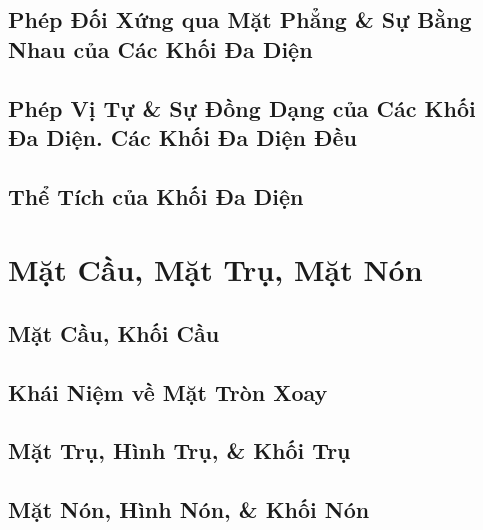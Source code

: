 \documentclass[oneside]{book}
\numberwithin{equation}{section}
\begin{document}
\section{Phép Đối Xứng qua Mặt Phẳng \& Sự Bằng Nhau của Các Khối Đa Diện}


\section{Phép Vị Tự \& Sự Đồng Dạng của Các Khối Đa Diện. Các Khối Đa Diện Đều}


\section{Thể Tích của Khối Đa Diện}


\chapter{Mặt Cầu, Mặt Trụ, Mặt Nón}

\section{Mặt Cầu, Khối Cầu}


\section{Khái Niệm về Mặt Tròn Xoay}


\section{Mặt Trụ, Hình Trụ, \& Khối Trụ}


\section{Mặt Nón, Hình Nón, \& Khối Nón}
\end{document}
